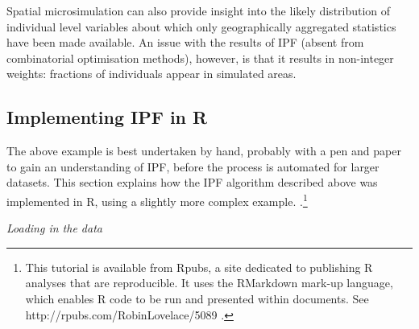 Spatial microsimulation can also provide insight into the likely
distribution of individual level variables about which only
geographically aggregated statistics have been made available.
An issue
with the results of IPF (absent from combinatorial optimisation methods),
however, is that it results in non-integer weights: fractions of individuals
appear in simulated areas.

\subsection{Implementing IPF in R} \label{simplementing}
The above example is best undertaken by hand, probably with a pen and paper
to gain an understanding of IPF, before the process is automated for 
larger datasets. This section explains how the IPF
algorithm described above was implemented in R, using a slightly more
complex example.
\citep{Lovelace2013-trs}.\footnote{This tutorial is available from Rpubs, a site dedicated
to publishing R analyses that are reproducible. It uses the RMarkdown
mark-up language, which enables R code to be run and presented within
documents. See http://rpubs.com/RobinLovelace/5089 \label{fnrpub} .}

\emph{Loading in the data}

